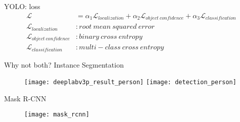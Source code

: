 \begin{frame}{YOLO: loss}
  \begin{align*}
    \mathcal{L} &= \alpha_{1}\mathcal{L}_{localization} + \alpha_{2}\mathcal{L}_{object~confidence} + \alpha_{3}\mathcal{L}_{classification} \\
    \mathcal{L}_{localization}&: root~mean~squared~error \\
    \mathcal{L}_{object~confidence}&: binary~cross~entropy \\
    \mathcal{L}_{classification}&: multi-class~cross~entropy
  \end{align*}
\end{frame}




\begin{frame}{Why not both? Instance Segmentation}
  \begin{figure}
    \texttt{[image: deeplabv3p\_result\_person]}
    \texttt{[image: detection\_person]}
  \end{figure}

\end{frame}


\begin{frame}{Mask R-CNN}
  \begin{figure}
    \texttt{[image: mask\_rcnn]}
  \end{figure}

\end{frame}



